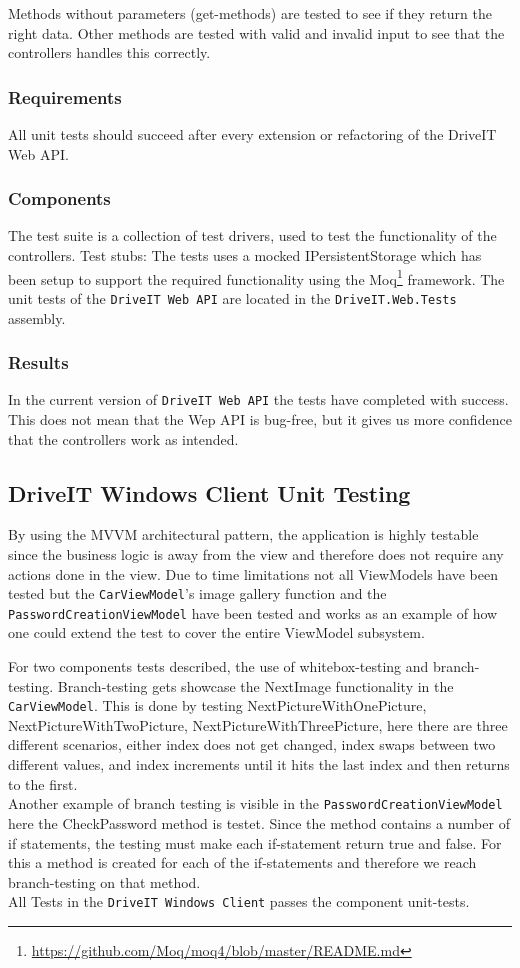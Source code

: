 Methods without parameters (get-methods) are tested to see if they return the right data. Other methods are tested with valid and invalid input to see that the controllers handles this correctly.

\subsubsection{Requirements}
All unit tests should succeed after every extension or refactoring of the DriveIT Web API.

\subsubsection{Components}
The test suite is a collection of test drivers, used to test the functionality of the controllers.
Test stubs: The tests uses a mocked IPersistentStorage which has been setup to support the required functionality using the Moq\footnote{\url{https://github.com/Moq/moq4/blob/master/README.md}} framework.
The unit tests of the \texttt{DriveIT Web API} are located in the \texttt{DriveIT.Web.Tests} assembly.

\subsubsection{Results}
In the current version of \texttt{DriveIT Web API} the tests have completed with success. This does not mean that the Wep API is bug-free, but it gives us more confidence that the controllers work as intended.

\subsection{DriveIT Windows Client Unit Testing}
By using the MVVM architectural pattern, the application is highly testable since the business logic is away from the view and therefore does not require any actions done in the view. Due to time limitations not all ViewModels have been tested but the \texttt{CarViewModel}'s image gallery function and the \texttt{PasswordCreationViewModel} have been tested and works as an example of how one could extend the test to cover the entire ViewModel subsystem.

For two components tests described, the use of whitebox-testing and branch-testing. Branch-testing gets showcase the NextImage functionality in the \texttt{CarViewModel}. This is done by testing NextPictureWithOnePicture, NextPictureWithTwoPicture, NextPictureWithThreePicture, here there are three different scenarios, either index does not get changed, index swaps between two different values, and index increments until it hits the last index and then returns to the first. \\
Another example of branch testing is visible in the \texttt{PasswordCreationViewModel} here the CheckPassword method is testet. Since the method contains a number of if statements, the testing must make each if-statement return true and false. For this a method is created for each of the if-statements and therefore we reach branch-testing on that method.\\

All Tests in the \texttt{DriveIT Windows Client} passes the component unit-tests.
